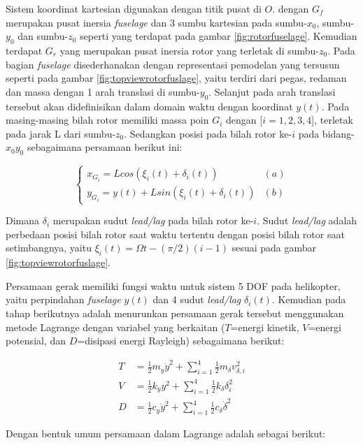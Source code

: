 Sistem koordinat kartesian digunakan dengan titik pusat di $O$. dengan $G_f$ merupakan pusat inersia \textit{fuselage} dan 3 sumbu kartesian pada sumbu-$x_0$, sumbu-$y_0$ dan sumbu-$z_0$ seperti yang terdapat pada gambar \ref{fig:rotorfuselage}. Kemudian terdapat $G_r$ yang merupakan pusat inersia rotor yang terletak di sumbu-$z_0$. Pada bagian \textit{fuselage} disederhanakan dengan representasi pemodelan yang tersusun seperti pada gambar \ref{fig:topviewrotorfuslage}, yaitu terdiri dari pegas, redaman dan massa dengan 1 arah translasi di sumbu-$y_0$. Selanjut pada arah translasi tersebut akan didefinisikan dalam domain waktu dengan koordinat $y(t)$. Pada masing-masing bilah rotor memiliki massa poin $G_i$ dengan [$i=1,2,3,4$], terletak pada jarak L dari sumbu-$z_0$. Sedangkan posisi pada bilah rotor ke-$i$ pada bidang-$x_0y_0$ sebagaimana persamaan berikut ini:

\begin{equation}
\begin{cases}
x_{G_i} = L cos(\xi_i(t)+\delta_i(t))&(a) \\ 
y_{G_i} = y(t) + L sin(\xi_i(t)+\delta_i(t))&(b)
\end{cases}
\label{eq:posisixy}
\end{equation}

Dimana $\delta_i$ merupakan sudut \textit{lead/lag} pada bilah rotor ke-$i$. Sudut \textit{lead/lag} adalah perbedaan posisi bilah rotor saat waktu tertentu dengan posisi bilah rotor saat setimbangnya, yaitu $\xi_i(t)=\Omega t-(\pi/2)(i-1)$ sesuai pada gambar \ref{fig:topviewrotorfuslage}.

Persamaan gerak memiliki fungsi waktu untuk sistem 5 DOF pada helikopter, yaitu perpindahan \textit{fuselage} $y(t)$ dan 4 sudut \textit{lead/lag} $\delta_i(t)$. Kemudian pada tahap berikutnya adalah menurunkan persamaan gerak tersebut menggunakan metode Lagrange dengan variabel yang berkaitan ($T$=energi kinetik, $V$=energi potensial, dan $D$=disipasi energi Rayleigh) sebagaimana berikut:

\begin{align}
T &= \frac{1}{2}m_y\dot{y}^2 + \sum_{i=1}^{4}\frac{1}{2} m_{\delta} v^2_{\delta,i}\\
V &= \frac{1}{2}k_yy^2+\sum_{i=1}^{4}\frac{1}{2}k_\delta \delta_i^2\\
D &= \frac{1}{2}c_y\dot{y}^2+\sum_{i=1}^{4}\frac{1}{2}c_\delta \dot{\delta}^2
\end{align}

Dengan bentuk umum persamaan dalam Lagrange adalah sebagai berikut:


